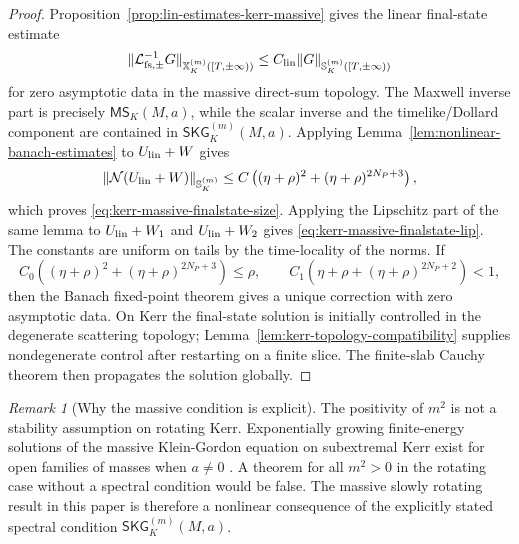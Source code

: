 \documentclass[11pt]{article}
\numberwithin{equation}{section}
\theoremstyle{plain}
\theoremstyle{definition}
\theoremstyle{remark}
\newtheorem{remark}{Remark}[section]
\newcommand{\SKG}{\mathsf{SKG}}
\newcommand{\MScat}{\mathsf{MS}}
\begin{document}
\begin{proof}
Proposition~\ref{prop:lin-estimates-kerr-massive} gives the linear final-state estimate
\begin{equation}\label{eq:kerr-massive-linear-finalstate-est}
 \|\mathcal L^{-1}_{{\rm fs},\pm}G\|_{\mathbb X_K^{(m)}([T,\pm\infty))}
 \le C_{\rm lin}\|G\|_{\mathbb S_K^{(m)}([T,\pm\infty))}
\end{equation}
for zero asymptotic data in the massive direct-sum topology.  The Maxwell inverse part is precisely \(\MScat_K(M,a)\), while the scalar inverse and the timelike/Dollard component are contained in \(\SKG^{(m)}_K(M,a)\).  Applying Lemma~\ref{lem:nonlinear-banach-estimates} to \(U_{\rm lin}+W\) gives
\begin{equation}
 \|\mathcal N(U_{\rm lin}+W)\|_{\mathbb S_K^{(m)}}
 \le C\left((\eta+\rho)^2+(\eta+\rho)^{2N_P+3}\right),
\end{equation}
which proves \eqref{eq:kerr-massive-finalstate-size}.  Applying the Lipschitz part of the same lemma to \(U_{\rm lin}+W_1\) and \(U_{\rm lin}+W_2\) gives \eqref{eq:kerr-massive-finalstate-lip}.  The constants are uniform on tails by the time-locality of the norms.  If
\begin{equation}
 C_0\left((\eta+\rho)^2+(\eta+\rho)^{2N_P+3}\right)\le \rho,
 \qquad
 C_1\left(\eta+\rho+(\eta+\rho)^{2N_P+2}\right)<1,
\end{equation}
then the Banach fixed-point theorem gives a unique correction with zero asymptotic data.  On Kerr the final-state solution is initially controlled in the degenerate scattering topology; Lemma~\ref{lem:kerr-topology-compatibility} supplies nondegenerate control after restarting on a finite slice.  The finite-slab Cauchy theorem then propagates the solution globally.
\end{proof}

\begin{remark}[Why the massive condition is explicit]\label{rem:massive-kerr-obstruction}
The positivity of \(m^2\) is not a stability assumption on rotating Kerr.  Exponentially growing finite-energy solutions of the massive Klein-Gordon equation on subextremal Kerr exist for open families of masses when \(a\ne0\) \cite{ShlapentokhRothmanKGKerr}.  A theorem for all \(m^2>0\) in the rotating case without a spectral condition would be false.  The massive slowly rotating result in this paper is therefore a nonlinear consequence of the explicitly stated spectral condition \(\SKG^{(m)}_K(M,a)\).
\end{remark}
\end{document}
